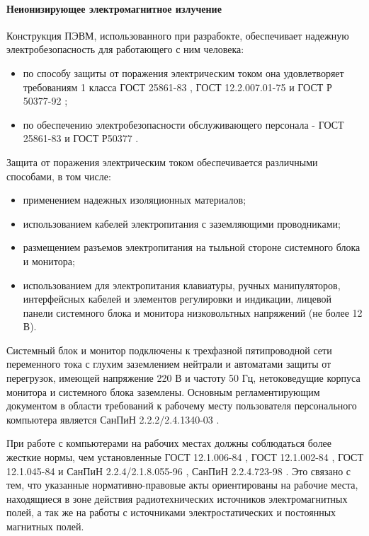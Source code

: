 \paragraph{Неионизирующее электромагнитное излучение}

Конструкция ПЭВМ, использованного при разрабокте, обеспечивает надежную
электробезопасность для работающего с ним человека:

\begin{itemize}
    \item   по способу защиты от поражения электрическим током она удовлетворяет требованиям
            1 класса ГОСТ 25861-83 \cite{ecology_gost_25861_83}, ГОСТ 12.2.007.01-75
            \cite{ecology_gost_007_01_75} и ГОСТ Р 50377-92 \cite{ecology_gost_50377_92};

    \item   по обеспечению электробезопасности обслуживающего персонала - ГОСТ 25861-83
            \cite{ecology_gost_25861_83} и ГОСТ Р50377 \cite{ecology_gost_50377_92}.
\end{itemize}

Защита от поражения электрическим током обеспечивается различными способами,
в том числе:

\begin{itemize}
    \item   применением надежных изоляционных материалов;
    \item   использованием кабелей электропитания с заземляющими проводниками;
    \item   размещением разъемов электропитания на тыльной стороне системного блока
            и монитора;
    \item   использованием для электропитания клавиатуры, ручных манипуляторов,
            интерфейсных кабелей и элементов регулировки и индикации, лицевой панели
            системного блока и монитора низковольтных напряжений (не более 12 В).
\end{itemize}

Системный блок и монитор подключены к трехфазной пятипроводной сети переменного тока
с глухим заземлением нейтрали и автоматами защиты от перегрузок, имеющей
напряжение 220 В и частоту 50 Гц, нетоковедущие корпуса монитора и системного блока
заземлены. Основным регламентирующим документом в области требований к рабочему
месту пользователя персонального компьютера является СанПиН 2.2.2/2.4.1340-03
\cite{ecology_sanpin_1340_03}.

При работе с компьютерами на рабочих местах должны соблюдаться более жесткие нормы,
чем установленные ГОСТ 12.1.006-84 \cite{ecology_gost_006_84}, ГОСТ 12.1.002-84
\cite{ecology_gost_002_84}, ГОСТ 12.1.045-84 \cite{ecology_gost_045_84} и
СанПиН 2.2.4/2.1.8.055-96 \cite{ecology_sanpin_055_96}, СанПиН 2.2.4.723-98
\cite{ecology_sanpin_723_98}. Это связано с тем, что указанные нормативно-правовые
акты ориентированы на рабочие места, находящиеся в зоне действия радиотехнических
источников электромагнитных полей, а так же на работы с источниками электростатических
и постоянных магнитных полей.


